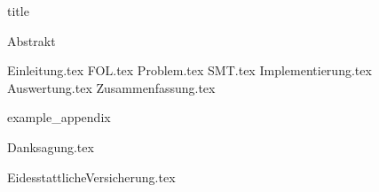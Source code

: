 \documentclass[12pt]{scrreport}
\begin{document}
    {title}

    \frontmatter

    {Abstrakt}
    \newpage

    \tableofcontents


    \mainmatter

    {Einleitung.tex}
    {FOL.tex}
    {Problem.tex}
    {SMT.tex}
    {Implementierung.tex}
    {Auswertung.tex}
    {Zusammenfassung.tex}

    \newpage
    \printbibliography[heading = bibintoc, title = Literatur]    %

    \addappendix
    {example_appendix}
    \newpage


    \clearpage
    {Danksagung.tex}
    \newpage

    \clearpage
    {EidesstattlicheVersicherung.tex}


\end{document}
